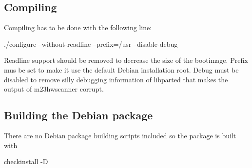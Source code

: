 \subsection{Compiling}
Compiling has to be done with the following line:
\begin{verbatim*}
./configure --without-readline --prefix=/usr --disable-debug
\end{verbatim*}
Readline support should be removed to decrease the size of the bootimage. Prefix mus be set to make it use the default Debian installation root. Debug must be disabled to remove silly debugging information of libparted that makes the output of m23hwscanner corrupt.

\subsection{Building the Debian package}
There are no Debian package building scripts included so the package is built with
\begin{verbatim*}
checkinstall -D
\end{verbatim*}
